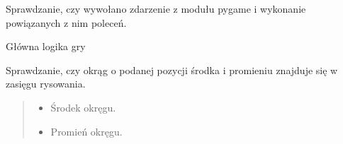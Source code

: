 \documentclass[letterpaper,10pt,polish]{sphinxmanual}
\begin{document}
\begin{fulllineitems}
\begin{fulllineitems}
\begin{quote}
\begin{description}
\end{description}\end{quote}

\end{fulllineitems}


\begin{fulllineitems}
\label{\detokenize{main:main.Main.events_update}}
\pysigstartsignatures
{}
\pysigstopsignatures
\sphinxAtStartPar
Sprawdzanie, czy wywołano zdarzenie z modułu pygame i wykonanie
powiązanych z nim poleceń.

\end{fulllineitems}


\begin{fulllineitems}
\label{\detokenize{main:main.Main.game}}
\pysigstartsignatures
{}
\pysigstopsignatures
\sphinxAtStartPar
Główna logika gry

\end{fulllineitems}


\begin{fulllineitems}
\label{\detokenize{main:main.Main.is_in_screen_range}}
\pysigstartsignatures
{}
\pysigstopsignatures
\sphinxAtStartPar
Sprawdzanie, czy okrąg o podanej pozycji środka i promieniu znajduje
się w zasięgu rysowania.
\begin{quote}\begin{description}
\begin{itemize}
\item {} 
\sphinxAtStartPar
{} \textendash{} Środek okręgu.

\item {} 
\sphinxAtStartPar
{} \textendash{} Promień okręgu.


\end{itemize}
\end{description}
\end{quote}
\end{fulllineitems}
\end{fulllineitems}
\end{document}

